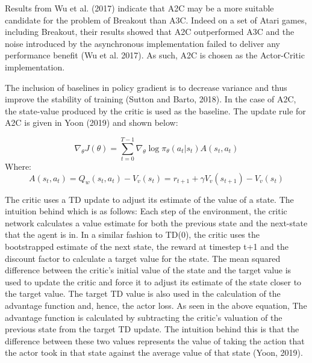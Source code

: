 \documentclass{article}
\begin{document}
Results from Wu et al. (2017) indicate that A2C may be a more suitable candidate for the problem of Breakout than A3C. Indeed on a set of Atari games, including Breakout, their results showed that A2C outperformed A3C and the noise introduced by the asynchronous implementation failed to deliver any performance benefit (Wu et al. 2017). As such, A2C is chosen as the Actor-Critic implementation.

The inclusion of baselines in policy gradient is to decrease variance and thus improve the stability of training (Sutton and Barto, 2018). In the case of A2C, the state-value produced by the critic is used as the baseline. The update rule for A2C is given in Yoon (2019) and shown below:

\begin{equation}
\nabla_{\theta} J(\theta) = \sum_{t=0}^{T-1}\nabla_{\theta}\log{\pi_{\theta}}(a_{t} | s_{t}) A(s_{t}, a_{t})
\end{equation}
Where:
\begin{equation}
A(s_{t}, a_{t}) = Q_{w}(s_{t}, a_{t}) - V_{v}(s_{t}) = r_{t+1} + \gamma V_{v}(s_{t+1}) - V_{v}(s_{t})
\end{equation}

The critic uses a TD update to adjust its estimate of the value of a state. The intuition behind which is as follows: Each step of the environment, the critic network calculates a value estimate for both the previous state and the next-state that the agent is in. In a similar fashion to TD(0), the critic uses the bootstrapped estimate of the next state, the reward at timestep t+1 and the discount factor to calculate a target value for the state. The mean squared difference between the critic's initial value of the state and the target value is used to update the critic and force it to adjust its estimate of the state closer to the target value. The target TD value is also used in the calculation of the advantage function and, hence, the actor loss. As seen in the above equation, The advantage function is calculated by subtracting the critic's valuation of the previous state from the target TD update. The intuition behind this is that the difference between these two values represents the value of taking the action that the actor took in that state against the average value of that state (Yoon, 2019). 
\end{document}
